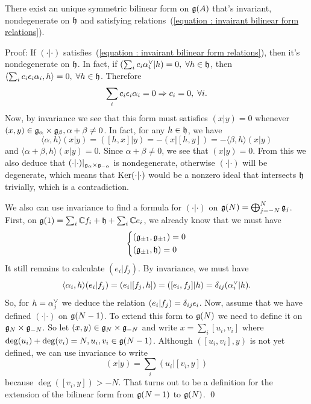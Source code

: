 \begin{dang}
    \begin{theorem}
        There exist an unique symmetric bilinear form on $\mathfrak{g}(A)$ that's invariant, nondegenerate on $\mathfrak{h}$ and satisfying 
        relations~(\ref{equation : invairant bilinear form relations}).
    \end{theorem}
\end{dang}
Proof: If $(\cdot|\cdot)$ satisfies~(\ref{equation : invairant bilinear form relations}), then it's nondegenerate on $\mathfrak{h}$. 
In fact, if $(\sum_ic_i\alpha^{\vee}_i|h)=0,\;\forall h\in\mathfrak{h}$, 
then $\langle \sum_ic_i\epsilon_i\alpha_i, h\rangle= 0,\;\forall h\in\mathfrak{h}$. Therefore
\begin{equation}
    \sum_ic_i\epsilon_i\alpha_i = 0\Rightarrow c_i = 0,\;\forall i.
\end{equation}
Now, by invariance we see that this form must satisfies $(x|y)=0$ whenever 
$(x,y)\in\mathfrak{g}_\alpha\times\mathfrak{g}_\beta,\alpha+\beta\neq0$. In fact, for any $h\in\mathfrak{h}$, we have 
\begin{equation}
    \langle \alpha,h\rangle(x|y) = ([h,x]|y)=-(x|[h,y])=-\langle\beta,h\rangle(x|y)
\end{equation}
and $\langle\alpha+\beta,h\rangle(x|y)=0$. Since $\alpha+\beta\neq0$, we see that $(x|y)=0$. From this we also deduce that 
$(\cdot|\cdot)|_{\mathfrak{g}_\alpha\times\mathfrak{g}_{-\alpha}}$ is nondegenerate, otherwise $(\cdot|\cdot)$ will be degenerate, which means 
that $\text{Ker}(\cdot|\cdot)$ would be a nonzero ideal that intersects $\mathfrak{h}$ trivially, which is a contradiction.\par 

We also can use invariance to find a formula for $(\cdot|\cdot)$ on $\mathfrak{g}(N) = \bigoplus_{j=-N}^N\mathfrak{g}_j$. First, on 
$\mathfrak{g}(1) = \sum_i\mathbb{C} f_i+\mathfrak{h}+\sum_i\mathbb{C} e_i$, we already know that we must have 
\begin{equation}
    \left\{\begin{aligned}
        &(\mathfrak{g}_{\pm1},\mathfrak{g}_{\pm1}) = 0\\
        &(\mathfrak{g}_{\pm1},\mathfrak{h}) = 0
    \end{aligned}\right.
\end{equation}
It still remains to calculate $(e_i|f_j)$. By invariance, we must have 
\begin{equation}
    \langle\alpha_i,h\rangle(e_i|f_j)=(e_i|[f_j,h])=([e_i,f_j]|h) = \delta_{ij}(\alpha^{\vee}_i|h).
\end{equation}
So, for $h=\alpha^{\vee}_j$ we deduce the relation $(e_i|f_j)=\delta_{ij}\epsilon_i$. Now, assume that we have defined 
$(\cdot|\cdot)$ on $\mathfrak{g}(N-1)$. To extend this form to $\mathfrak{g}(N)$ we need to define it on $\mathfrak{g}_N\times\mathfrak{g}_{-N}$. 
So let $(x,y)\in\mathfrak{g}_N\times\mathfrak{g}_{-N}$ and write $x=\sum_i[u_i,v_i]$ where $\deg(u_i)+\deg(v_i)=N, u_i,v_i\in\mathfrak{g}(N-1)$. 
Although $([u_i,v_i], y)$ is not yet defined, we can use invariance to write 
\begin{equation}
    (x|y) = \sum_i(u_i|[v_i,y])
\end{equation}
because $\deg([v_i,y])>-N$. That turns out to be a definition for the extension of the bilinear form from 
$\mathfrak{g}(N-1)$ to $\mathfrak{g}(N)$. \qed

